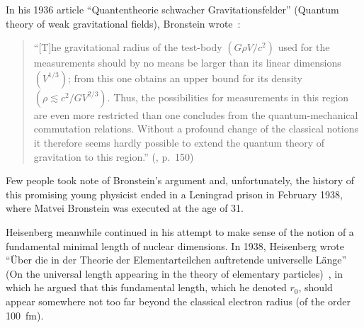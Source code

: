 \documentclass{article}
\begin{document}
In his 1936 article ``Quantentheorie schwacher Gravitationsfelder''
(Quantum theory of weak gravitational fields), Bronstein
wrote~\cite{Bronstein,Bronstein2}:
%
\begin{quote}
``[T]he gravitational radius of the test-body $(G\rho V/c^2)$ used
  for the measurements should by no means be larger than its linear
  dimensions $(V^{1/3})$; from this one obtains an upper bound for its
  density $(\rho \lesssim c^2/G V^{2/3})$. Thus, the possibilities for
  measurements in this region are even more restricted than one
  concludes from the quantum-mechanical commutation relations. Without
  a profound change of the classical notions it therefore seems hardly
  possible to extend the quantum theory of gravitation to this
  region.''%
  (\cite{Bronstein2}, p.~150)%
\end{quote}
%
Few people took note of Bronstein's argument and, unfortunately, the history of this promising young physicist ended in a
Leningrad prison in February 1938, where Matvei Bronstein was executed at the age of 31. 

Heisenberg meanwhile continued in his attempt to make sense of the notion of a fundamental minimal length of nuclear dimensions. 
In 1938, Heisenberg wrote ``{\"U}ber die in der Theorie der Elementarteilchen auftretende universelle
L{\"a}nge'' (On the universal length appearing in the theory of elementary particles)~\cite{Heisenberg1}, in which he 
argued that this fundamental length, which he denoted $r_0$, should appear somewhere not too far beyond the classical 
electron radius (of the order 100~fm).
\end{document}
